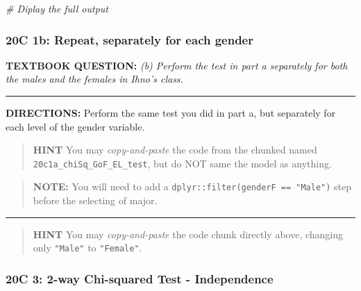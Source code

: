 \documentclass[
]{article}
\newenvironment{Shaded}{\begin{snugshade}}{\end{snugshade}}
\newcommand{\CommentTok}[1]{\textcolor[rgb]{0.56,0.35,0.01}{\textit{#1}}}
\begin{document}
\begin{Shaded}
\begin{Highlighting}[]
\CommentTok{\# Diplay the full output}
\end{Highlighting}
\end{Shaded}

\clearpage

\hypertarget{c-1b-repeat-separately-for-each-gender}{%
\subsubsection{20C 1b: Repeat, separately for each
gender}\label{c-1b-repeat-separately-for-each-gender}}

\textbf{TEXTBOOK QUESTION:} \emph{(b) Perform the test in part a
separately for both the males and the females in Ihno's class.}

\begin{center}\rule{0.5\linewidth}{0.5pt}\end{center}

\textbf{DIRECTIONS:} Perform the same test you did in part a, but
separately for each level of the gender variable.

\begin{quote}
\textbf{HINT} You may \emph{copy-and-paste} the code from the chunked
named \texttt{20c1a\_chiSq\_GoF\_EL\_test}, but do NOT same the model as
anything.
\end{quote}

\begin{quote}
\textbf{NOTE:} You will need to add a
\texttt{dplyr::filter(genderF\ ==\ "Male")} step before the selecting of
major.
\end{quote}

\begin{center}\rule{0.5\linewidth}{0.5pt}\end{center}

\begin{quote}
\textbf{HINT} You may \emph{copy-and-paste} the code chunk directly
above, changing only \texttt{"Male"} to \texttt{"Female"}.
\end{quote}

\clearpage

\hypertarget{c-3-2-way-chi-squared-test---independence}{%
\subsubsection{20C 3: 2-way Chi-squared Test -
Independence}\label{c-3-2-way-chi-squared-test---independence}}
\end{document}
